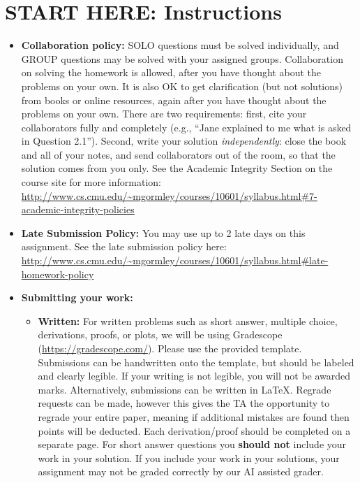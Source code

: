 \documentclass[11pt,addpoints,answers]{exam}
\begin{document}
\section*{START HERE: Instructions}
\begin{itemize}
\item \textbf{Collaboration policy:} {\color{red} SOLO questions must be solved individually, and GROUP questions may be solved with your assigned groups.} Collaboration on solving the homework is allowed, after you have thought about the problems on your own. It is also OK to get clarification (but not solutions) from books or online resources, again after you have thought about the problems on your own. There are two requirements: first, cite your collaborators fully and completely (e.g., ``Jane explained to me what is asked in Question 2.1''). Second, write your solution {\em independently}: close the book and all of your notes, and send collaborators out of the room, so that the solution comes from you only.  See the Academic Integrity Section on the course site for more information: \url{http://www.cs.cmu.edu/~mgormley/courses/10601/syllabus.html#7-academic-integrity-policies}

\item\textbf{Late Submission Policy:} {\color{red} You may use up to 2 late days on this assignment.} See the late submission policy here: \url{http://www.cs.cmu.edu/~mgormley/courses/10601/syllabus.html#late-homework-policy}

\item\textbf{Submitting your work:} 

\begin{itemize}

\item \textbf{Written:} For written problems such as short answer, multiple choice, derivations, proofs, or plots, we will be using Gradescope (\url{https://gradescope.com/}). Please use the provided template. Submissions can be handwritten onto the template, but should be labeled and clearly legible. If your writing is not legible, you will not be awarded marks. Alternatively, submissions can be written in LaTeX. Regrade requests can be made, however this gives the TA the opportunity to regrade your entire paper, meaning if additional mistakes are found then points will be deducted.
Each derivation/proof should be  completed on a separate page. For short answer questions you \textbf{should not} include your work in your solution.  If you include your work in your solutions, your assignment may not be graded correctly by our AI assisted grader. 

\end{itemize}

\end{itemize}\clearpage
\end{document}
